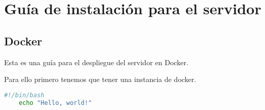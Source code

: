 
\cleardoublepage

\chapter{Guía de instalación para el servidor}
\label{Appendix:Key1}

\section{Docker}
\label{makereference7.1}
Esta es una guía para el despliegue del servidor en Docker.

Para ello primero tenemos que tener una instancia de docker.
\begin{lstlisting}[language=bash,caption={bash version}]
    #!/bin/bash
    echo "Hello, world!"
    \end{lstlisting}


